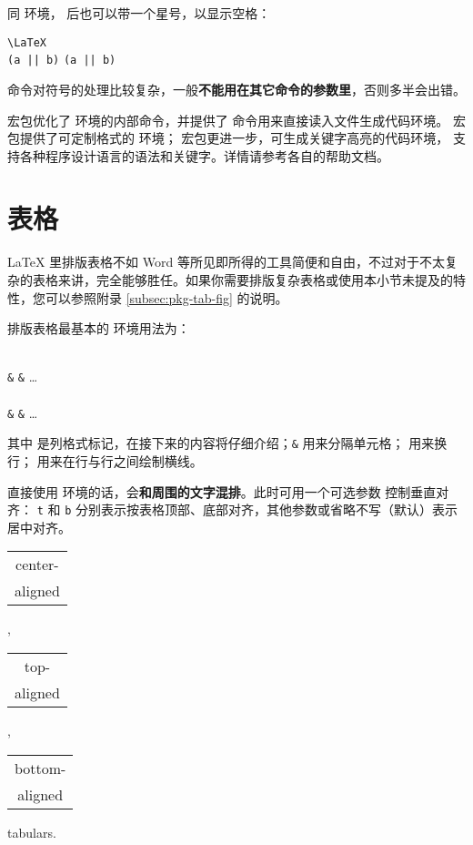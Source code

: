 同  环境， 后也可以带一个星号，以显示空格：
\begin{example}
\verb|\LaTeX| \\
\verb+(a || b)+ \verb*+(a || b)+
\end{example}

 命令对符号的处理比较复杂，一般\textbf{不能用在其它命令的参数里}，否则多半会出错。

 宏包优化了  环境的内部命令，并提供了  命令用来直接读入文件生成代码环境。
 宏包提供了可定制格式的  环境； 宏包更进一步，可生成关键字高亮的代码环境，
支持各种程序设计语言的语法和关键字。详情请参考各自的帮助文档。

\section{表格}\label{sec:tabular}

\LaTeX{} 里排版表格不如 Word 等所见即所得的工具简便和自由，不过对于不太复杂的表格来讲，完全能够胜任。如果你需要排版复杂表格或使用本小节未提及的特性，您可以参照附录 \ref{subsec:pkg-tab-fig} 的说明。

排版表格最基本的  环境用法为：
\begin{command}
\\
  \texttt\&  \texttt\& \ldots\ \crcmd \\
  \\
  \texttt\&  \texttt\& \ldots\ \crcmd \\
\end{command}
其中  是列格式标记，在接下来的内容将仔细介绍；\texttt\& 用来分隔单元格；
\crcmd{} 用来换行； 用来在行与行之间绘制横线。

直接使用  环境的话，会\textbf{和周围的文字混排}。此时可用一个可选参数  控制垂直对齐：
\verb|t| 和 \verb|b| 分别表示按表格顶部、底部对齐，其他参数或省略不写（默认）表示居中对齐。
\begin{example}
\begin{tabular}{|c|}
  center-\\ aligned \\
\end{tabular},
\begin{tabular}[t]{|c|}
  top-\\ aligned \\
\end{tabular},
\begin{tabular}[b]{|c|}
  bottom-\\ aligned\\
\end{tabular} tabulars.
\end{example}


